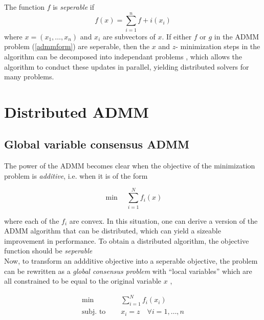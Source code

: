 \documentclass[11pt]{article}
\begin{document}
The function $f$ is \emph{seperable} if
\[
    f(x) = \sum_{i=1}^n f+i(x_i)  
\]
where $x = (x_1, \ldots, x_n)$ and $x_i$ are subvectors of $x$. If either $f$ or $g$ 
in the ADMM problem (\ref{admmform}) are seperable, then the $x$ and $z$- minimization 
steps in the algorithm can  be decomposed into independant problems \cite{boydistributed}, which allows 
the algorithm to conduct these updates in parallel, yielding distributed solvers 
for many problems.
 
\section{Distributed ADMM}

\subsection*{Global variable consensus ADMM}

The power of the ADMM becomes clear when the objective of the minimization problem is 
\textit{additive}, i.e. when it is of the form 

\begin{equation} \label{additive}
    \min \quad \sum_{i=1}^N f_i(x)
\end{equation}
    
where each of the $f_i$ are convex. In this situation, one can derive a version of the ADMM 
algorithm that can be distributed, which can yield a sizeable improvement in performance. 
To obtain a distributed algorithm, the objective function should be \emph{seperable} \\

Now, to transform an addditive objective into a seperable objective, the problem 
can be rewritten as a \emph{global consensus problem} with 
``local variables'' which are all constrained to be equal to the original
variable $x$ \cite{nedic201010}, 

\begin{equation}
\begin{aligned}
    \min \quad & \sum_{i=1}^N f_i(x_i) \\
    \textrm{subj. to } \quad & x_i = z \quad \forall i = 1, \ldots, n
\end{aligned}
\end{equation}
\end{document}
